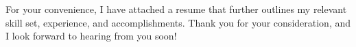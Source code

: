 \documentclass[11pt, a4paper]{awesome-cv}
\begin{document}
\begin{cvletter}
 For your convenience, I have attached a resume that further outlines my relevant skill set, experience, and accomplishments. Thank you for your consideration, and I look forward to hearing from you soon!


\end{cvletter}


\makeletterclosing
\end{document}
